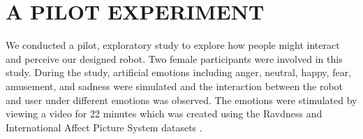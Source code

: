 \documentclass[letterpaper, 10 pt, conference]{ieeeconf}  %
\begin{document}


\section{A PILOT EXPERIMENT}
We conducted a pilot, exploratory study to explore how people might interact and perceive our designed robot. Two female participants were involved in this study. During the study, artificial emotions including anger, neutral, happy, fear, amusement, and sadness were simulated and the interaction between the robot and user under different emotions was observed. 
The emotions were stimulated by viewing a video for 22 minutes which was created using the Ravdness and International Affect Picture System datasets \cite{eerola2011comparison}. 

\end{document}
